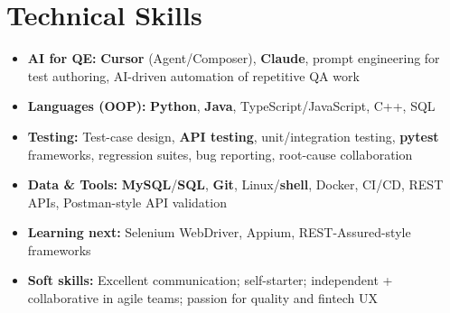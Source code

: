 \documentclass[a4paper,10pt]{article}
\begin{document}
\section{Technical Skills}
\small
\begin{itemize}[label={}]
  \item \textbf{AI for QE:} \textbf{Cursor} (Agent/Composer), \textbf{Claude}, prompt engineering for test authoring, AI-driven automation of repetitive QA work
  \item \textbf{Languages (OOP):} \textbf{Python}, \textbf{Java}, TypeScript/JavaScript, C++, SQL
  \item \textbf{Testing:} Test-case design, \textbf{API testing}, unit/integration testing, \textbf{pytest} frameworks, regression suites, bug reporting, root-cause collaboration
  \item \textbf{Data \& Tools:} \textbf{MySQL}/\textbf{SQL}, \textbf{Git}, Linux/\textbf{shell}, Docker, CI/CD, REST APIs, Postman-style API validation
  \item \textbf{Learning next:} Selenium WebDriver, Appium, REST-Assured-style frameworks
  \item \textbf{Soft skills:} Excellent communication; self-starter; independent + collaborative in agile teams; passion for quality and fintech UX
\end{itemize}
\end{document}
